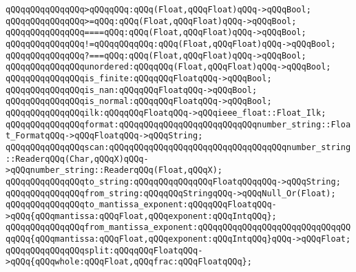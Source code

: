 \verb|qQQqqQQqqQQqqQQq>qQQqqQQq:qQQq(Float,qQQqFloat)qQQq->qQQqBool;|\newline
\verb|qQQqqQQqqQQqqQQq>=qQQq:qQQq(Float,qQQqFloat)qQQq->qQQqBool;|\newline
\newline
\verb|qQQqqQQqqQQqqQQq====qQQq:qQQq(Float,qQQqFloat)qQQq->qQQqBool;|\newline
\verb|qQQqqQQqqQQqqQQq!=qQQqqQQqqQQq:qQQq(Float,qQQqFloat)qQQq->qQQqBool;|\newline
\newline
\verb|qQQqqQQqqQQqqQQq?===qQQq:qQQq(Float,qQQqFloat)qQQq->qQQqBool;|\newline
\verb|qQQqqQQqqQQqqQQqunordered:qQQqqQQq(Float,qQQqFloat)qQQq->qQQqBool;|\newline
\newline
\verb|qQQqqQQqqQQqqQQqis_finite:qQQqqQQqFloatqQQq->qQQqBool;|\newline
\verb|qQQqqQQqqQQqqQQqis_nan:qQQqqQQqFloatqQQq->qQQqBool;|\newline
\verb|qQQqqQQqqQQqqQQqis_normal:qQQqqQQqFloatqQQq->qQQqBool;|\newline
\newline
\verb|qQQqqQQqqQQqqQQqilk:qQQqqQQqFloatqQQq->qQQqieee_float::Float_Ilk;|\newline
\newline
\verb|qQQqqQQqqQQqqQQqformat:qQQqqQQqqQQqqQQqqQQqqQQqqQQqnumber_string::Float_FormatqQQq->qQQqFloatqQQq->qQQqString;|\newline
\verb|qQQqqQQqqQQqqQQqscan:qQQqqQQqqQQqqQQqqQQqqQQqqQQqqQQqqQQqnumber_string::ReaderqQQq(Char,qQQqX)qQQq->qQQqnumber_string::ReaderqQQq(Float,qQQqX);|\newline
\newline
\verb|qQQqqQQqqQQqqQQqto_string:qQQqqQQqqQQqqQQqFloatqQQqqQQq->qQQqString;|\newline
\verb|qQQqqQQqqQQqqQQqfrom_string:qQQqqQQqStringqQQq->qQQqNull_Or(Float);|\newline
\newline
\verb|qQQqqQQqqQQqqQQqto_mantissa_exponent:qQQqqQQqFloatqQQq->qQQq{qQQqmantissa:qQQqFloat,qQQqexponent:qQQqIntqQQq};|\newline
\verb|qQQqqQQqqQQqqQQqfrom_mantissa_exponent:qQQqqQQqqQQqqQQqqQQqqQQqqQQqqQQqqQQq{qQQqmantissa:qQQqFloat,qQQqexponent:qQQqIntqQQq}qQQq->qQQqFloat;|\newline
\newline
\verb|qQQqqQQqqQQqqQQqsplit:qQQqqQQqFloatqQQq->qQQq{qQQqwhole:qQQqFloat,qQQqfrac:qQQqFloatqQQq};|\newline
